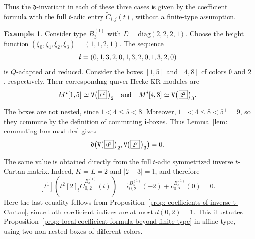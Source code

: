 \documentclass[12pt, leqno]{amsart}
\numberwithin{equation}{section}
\theoremstyle{plain}
\theoremstyle{definition}
\newtheorem{example}[lemma]{Example}
\newcommand{\Vkm}[1]{%
  \ttV\bigl(\hspace{0.2ex}\scalebox{.8}{\(\boxed{#1}\)}\hspace{0.2ex}\bigr)%
}
\newcommand{\de}{\mathfrak{d}}
\newcommand{\ii}{ \textbf{\textit{i}}}
\newcommand{\tC}{\widetilde{C}}
\newcommand{\tc}{\widetilde{c}}
\newcommand{\bfi}{\mathbf{i}}
\newcommand{\ttV}{\mathtt{V}}
\newcommand{\diag}{\mathrm{diag}}
\newcommand{\qtq}[1][{and}]{\quad\text{{#1}}\quad}
\begin{document}
Thus the \(\de\)-invariant in each of these three cases is given by
the coefficient formula with the full \(t\)-adic entry
\(\tC_{i,j}(t)\), without a finite-type assumption. 

\begin{example}
\label{ex: affine B3 commuting boxes of different colors}
Consider type \(B_3^{(1)}\) with \(D=\diag(2,2,2,1)\).
Choose the height function
\( (\xi_0,\xi_1,\xi_2,\xi_3)=(1,1,2,1) \).
The sequence
\[
\ii=(0,1,3,2,0,1,3,2,0,1,3,2,0)
\]
is \(Q\)-adapted and reduced.  Consider the boxes
$[1,5]$ and $[4,8]$
of colors \(0\) and \(2\), respectively. 
Their corresponding quiver Hecke KR-modules are
\[
M^\ii[1,5]\simeq\Vkm{0^2}_2 \qtq M^\ii[4,8]\simeq\Vkm{2^2}_3.
\]

The boxes are not nested, since \(1<4\leq5<8\).
Moreover, \(1^-<4\leq8<5^+=9\), so they commute
by the definition of commuting \(\bfi\)-boxes. Thus Lemma~\ref{lem: commuting box modules} gives
\[
\de\bigl(\Vkm{0^2}_2,\Vkm{2^2}_3\bigr)=0.
\]

The same value is obtained directly from the full \(t\)-adic
symmetrized inverse \(t\)-Cartan matrix.  Indeed, \(K=L=2\) and
\(|2-3|=1\), and therefore
\[
[t^1]\left(t^2[2]_t\tC_{0,2}^{B_3^{(1)}}(t)\right)
=\tc_{0,2}^{B_3^{(1)}}(-2)+\tc_{0,2}^{B_3^{(1)}}(0)=0.
\]
Here the last equality follows from
Proposition~\ref{prop: coefficients of inverse t-Cartan}, since both
coefficient indices are at most \(d(0,2)=1\).
This illustrates
Proposition~\ref{prop: local coefficient formula beyond finite type}
in affine type, using two non-nested boxes of different colors.
\end{example}


{}
\end{document}
